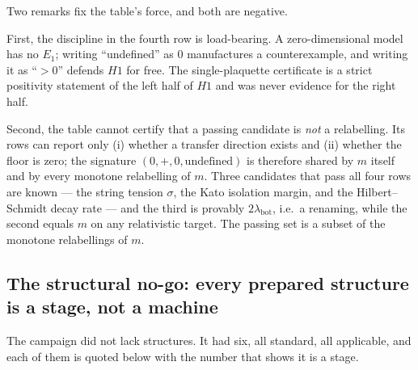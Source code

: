 Two remarks fix the table's force, and both are negative.

First, the discipline in the fourth row is load-bearing. A zero-dimensional model has no
$E_1$; writing ``undefined'' as $0$ manufactures a counterexample, and writing it as ``$>0$''
defends $H1$ for free. The single-plaquette certificate is a strict positivity statement of the
left half of $H1$ and was never evidence for the right half.

Second, the table cannot certify that a passing candidate is \emph{not} a relabelling. Its rows can
report only (i) whether a transfer direction exists and (ii) whether the floor is zero; the signature
$(0,+,0,\text{undefined})$ is therefore shared by $m$ itself and by every monotone relabelling of $m$.
Three candidates that pass all four rows are known --- the string tension $\sigma$, the Kato isolation
margin, and the Hilbert--Schmidt decay rate --- and the third is provably $2\lambda_{\mathrm{bot}}$,
i.e.\ a renaming, while the second equals $m$ on any relativistic target. The passing set is a subset
of the monotone relabellings of $m$.

\subsection{The structural no-go: every prepared structure is a stage, not a machine}
\label{sec:ng-stage}

The campaign did not lack structures. It had six, all standard, all applicable, and each of them is
quoted below with the number that shows it is a stage.

